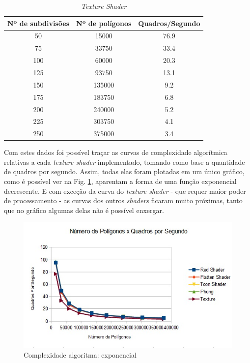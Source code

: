 \begin{table}[h]
	\centering
	\begin{tabular}{ccc}
		\toprule
		\textbf{Nº de subdivisões} & \textbf{Nº de polígonos} & 
		\textbf{Quadros/Segundo}  \\
		\midrule
		50 & 15000 & 76.9  \\
		75 & 33750 & 33.4  \\
		100 & 60000 &  20.3\\
		125 & 93750 & 13.1\\
		150 & 135000 &  9.2\\
		175 & 183750 &  6.8\\
		200 & 240000 &  5.2\\
		225 & 303750 &  4.1\\
		250 & 375000 &  3.4\\
		\bottomrule
	\end{tabular}
	\caption{ \textit{Texture Shader}}
	\label{tab03}
\end{table}

	Com estes dados foi possível traçar as curvas de complexidade algorítmica relativas a cada \textit{texture shader} implementado, tomando como base a quantidade de quadros por segundo. Assim, todas elas foram plotadas em um único gráfico, como é possível ver na Fig. \ref{complexidade}, aparentam a forma de uma função exponencial decrescente. E com exceção da curva do   \textit{texture shader} - que requer maior poder de processamento - as curvas dos outros \textit{shaders} ficaram muito próximas, tanto que no gráfico algumas delas não é possível enxergar. 

	 \begin{figure}[h]
	\centering
		\includegraphics[keepaspectratio=true,scale=1.0]{figuras/complexidade_exp.jpg}
	\caption{Complexidade algoritma: exponencial}
	\label{complexidade}
	\end{figure}

